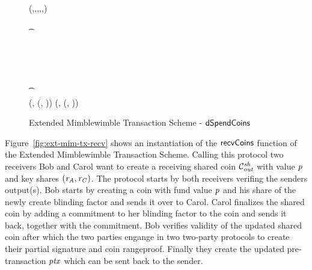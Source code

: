 \begin{landscape}
\begin{figure}
{{        \varPreTx \opFunResult \\
        \procCreatePreTx{\varMsg}{\funArray{\varCoinInp}}{\funArray{\varCoinOutAlice}}{\funArray{\varProofAlice}}{\varSigContext}{\funArray{\funGen{\varNonceAlice}}}{\cnstEmptySet}{\cnstFalsum} \< \< \\
        \< \sendmessageright*{\varPreTx} \< \\
        \< \< (\varMsg,\varInputs,\varOutputs,\varProofs,\varSigContext,\varCommits) \opFunResult \varPreTx \\
        \< \< \pcif \procVerfProof{\varProofs[0]}{\varOutputs[0]}  \\
        \< \< \t \pcreturn \cnstFalsum \\
        \< \< \varSigContext \opFunResult \procSetupCtx{\varSigContext}{\funGen{\varSecKeyCarol}}{\funGen{\varNonceCarol}} \\
        \< \< \varPreTx \opFunResult \procCreatePreTx{\varMsg}{\varInputs}{\varOutputs \opConc \varCoinOutCarol}{\varProof \opConc \varProofCarol}{\varSigContext}{\varCommits \opConc \funGen{\varNonceCarol}}{\cnstEmptySet}{\cnstFalsum} \\
        \< \sendmessageleft*{\varPreTx} \< \\
        \pcif {}  \< \< \\
        \t \pcreturn \cnstFalsum \< \< \\
        \pcreturn (\varPreTx, (\varSecKeyAlice, \varNonceAlice)) \< \< \pcreturn (\varPreTx, (\varSecKeyCarol, \varNonceCarol)) \\
        }
        }
        \caption{Extended Mimblewimble Transaction Scheme - $\mathsf{dSpendCoins}$ \label{fig:ext-mim-tx-spend}}
    \end{figure}
\end{landscape}
\restoregeometry

Figure~\ref{fig:ext-mim-tx-recv} shows an instantiation of the $\mathsf{recvCoins}$ function of the Extended Mimblewimble Transaction Scheme. Calling this protocol two receivers Bob and Carol want to create a
receiving shared coin $\mathcal{C}_{\mathit{out}}^{\mathit{sh}}$ with value $\mathit{p}$ and key shares $(\mathit{r}_{\mathit{A}}, \mathit{r}_{\mathit{C}})$. The protocol starts by both receivers verifing the senders output(s). Bob starts by creating a coin with
fund value $\mathit{p}$ and his share of the newly create blinding factor and sends it over to Carol. Carol finalizes the shared coin by adding a commitment to her blinding factor to the coin and sends it back, together
with the commitment. Bob verifies validity of the updated shared coin after which the two parties engange in two two-party protocols to create their partial signature and coin rangeproof. Finally they create the updated
pre-transaction $\mathit{ptx}$ which can be sent back to the sender.

